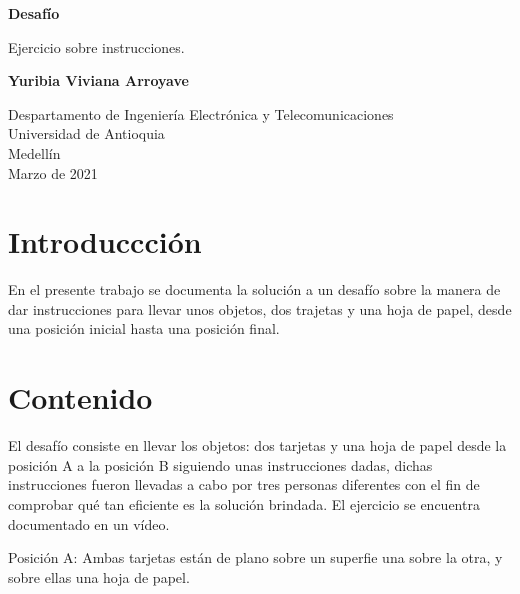 ﻿\documentclass{article}
\begin{document}
\begin{titlepage}
    \begin{center}
        \vspace*{1cm}
            
        \Huge
        \textbf{Desafío}
            
        \vspace{0.5cm}
        \LARGE
        Ejercicio sobre instrucciones.
            
        \vspace{1.5cm}
            
        \textbf{Yuribia Viviana Arroyave}
            
        \vfill
            
        \vspace{0.8cm}
            
        \Large
        Despartamento de Ingeniería Electrónica y Telecomunicaciones\\
        Universidad de Antioquia\\
        Medellín\\
        Marzo de 2021
            
    \end{center}
\end{titlepage}

\tableofcontents
\newpage
\section{Introduccción}\label{intro}
En el presente trabajo se documenta la solución a un desafío sobre la manera de dar instrucciones para llevar unos  objetos, dos trajetas y una hoja de papel, desde una posición inicial hasta una posición final.

\section{Contenido} \label{contenido}
El desafío consiste en llevar los objetos: dos tarjetas y una hoja de papel desde la posición A a la posición B siguiendo unas instrucciones dadas, dichas instrucciones fueron llevadas a cabo por tres personas diferentes con el fin de comprobar qué tan eficiente es la solución brindada. El ejercicio se encuentra documentado en un vídeo.
\vspace{0.8cm}

Posición A: Ambas tarjetas están de plano sobre un superfie una sobre la otra, y sobre ellas una hoja de papel.
\end{document}
